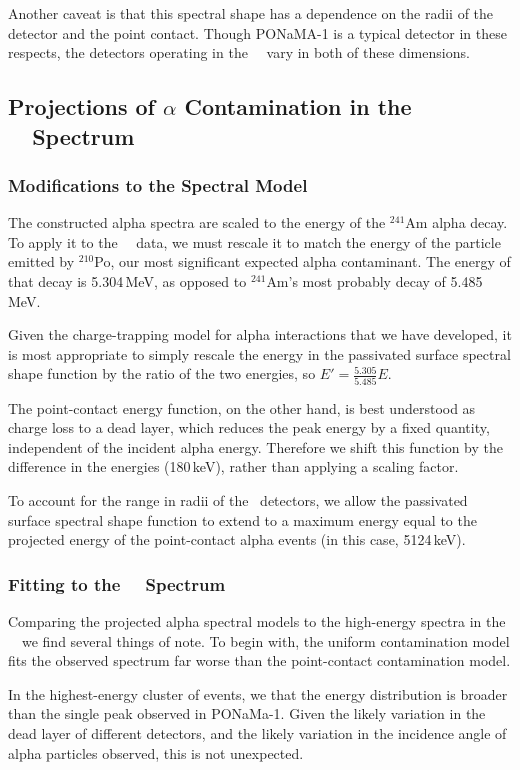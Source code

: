 \documentclass[groupedaddress,rmp,amsmath,amssymb,bibnotes,altaffilletter,twocolumn]{revtex4-1}
\begin{document}
Another caveat is that this spectral shape has a dependence on the radii of the detector and the point contact. Though PONaMA-1 is a typical detector in these respects, the detectors operating in the \MJ\ \DEM\ vary in both of these dimensions. 

\subsection{Projections of $\alpha$ Contamination in the \MJ\ \DEM\ Spectrum}
\subsubsection{Modifications to the Spectral Model}
The constructed alpha spectra are scaled to the energy of the $^{241}$Am alpha decay. To apply it to the \MJ\ \DEM\ data, we must rescale it to match the energy of the particle emitted by $^210$Po, our most significant expected alpha contaminant. The energy of that decay is 5.304\,MeV, as opposed to $^{241}$Am's most probably decay of 5.485\,MeV. 

Given the charge-trapping model for alpha interactions that we have developed, it is most appropriate to simply rescale the energy in the passivated surface spectral shape function by the ratio of the two energies, so $E' = \frac{5.305}{5.485}E$.

The point-contact energy function, on the other hand, is best understood as charge loss to a dead layer, which reduces the peak energy by a fixed quantity, independent of the incident alpha energy. Therefore we shift this function by the difference in the energies (180\,keV), rather than applying a scaling factor. 

To account for the range in radii of the \MJ\ detectors, we allow the passivated surface spectral shape function to extend to a maximum energy equal to the projected energy of the point-contact alpha events (in this case, 5124\,keV). 

\subsubsection{Fitting to the \MJ\ \DEM\ Spectrum}
Comparing the projected alpha spectral models to the high-energy spectra in the \MJ\ \DEM\, we find several things of note. To begin with, the uniform contamination model fits the observed spectrum far worse than the point-contact contamination model. 

In the highest-energy cluster of events, we that the energy distribution is broader than the single peak observed in PONaMa-1. Given the likely variation in the dead layer of different detectors, and the likely variation in the incidence angle of alpha particles observed, this is not unexpected. 
\end{document}
